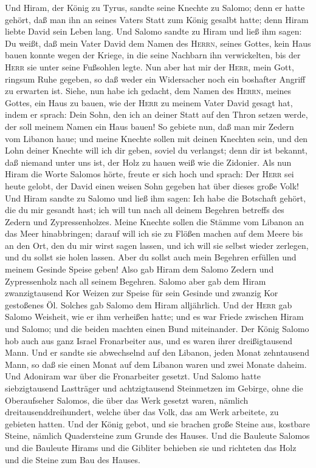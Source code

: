  Und Hiram, der König zu Tyrus, sandte seine Knechte zu
Salomo; denn er hatte gehört, daß man ihn an seines Vaters Statt zum
König gesalbt hatte; denn Hiram liebte David sein Leben lang.
 Und Salomo sandte zu Hiram und ließ ihm sagen:
 Du weißt, daß mein Vater David dem Namen des
\textsc{Herrn}, seines Gottes, kein Haus bauen konnte wegen der Kriege,
in die seine Nachbarn ihn verwickelten, bis der \textsc{Herr} sie unter
seine Fußsohlen legte.  Nun aber hat mir der
\textsc{Herr}, mein Gott, ringsum Ruhe gegeben, so daß weder ein
Widersacher noch ein boshafter Angriff zu erwarten ist. 
Siehe, nun habe ich gedacht, dem Namen des \textsc{Herrn}, meines
Gottes, ein Haus zu bauen, wie der \textsc{Herr} zu meinem Vater David
gesagt hat, indem er sprach: Dein Sohn, den ich an deiner Statt auf den
Thron setzen werde, der soll meinem Namen ein Haus bauen! 
So gebiete nun, daß man mir Zedern vom Libanon haue; und meine Knechte
sollen mit deinen Knechten sein, und den Lohn deiner Knechte will ich
dir geben, soviel du verlangst; denn dir ist bekannt, daß niemand unter
uns ist, der Holz zu hauen weiß wie die Zidonier.  Als nun
Hiram die Worte Salomos hörte, freute er sich hoch und sprach: Der
\textsc{Herr} sei heute gelobt, der David einen weisen Sohn gegeben hat
über dieses große Volk!  Und Hiram sandte zu Salomo und
ließ ihm sagen: Ich habe die Botschaft gehört, die du mir gesandt hast;
ich will tun nach all deinem Begehren betreffs des Zedern und
Zypressenholzes.  Meine Knechte sollen die Stämme vom
Libanon an das Meer hinabbringen; darauf will ich sie zu Flößen machen
auf dem Meere bis an den Ort, den du mir wirst sagen lassen, und ich
will sie selbst wieder zerlegen, und du sollst sie holen lassen. Aber du
sollst auch mein Begehren erfüllen und meinem Gesinde Speise geben!
 Also gab Hiram dem Salomo Zedern und Zypressenholz nach
all seinem Begehren.  Salomo aber gab dem Hiram
zwanzigtausend Kor Weizen zur Speise für sein Gesinde und zwanzig Kor
gestoßenes Öl. Solches gab Salomo dem Hiram alljährlich. 
Und der \textsc{Herr} gab Salomo Weisheit, wie er ihm verheißen hatte;
und es war Friede zwischen Hiram und Salomo; und die beiden machten
einen Bund miteinander.  Der König Salomo hob auch aus
ganz Israel Fronarbeiter aus, und es waren ihrer dreißigtausend Mann.
 Und er sandte sie abwechselnd auf den Libanon, jeden
Monat zehntausend Mann, so daß sie einen Monat auf dem Libanon waren und
zwei Monate daheim. Und Adoniram war über die Fronarbeiter gesetzt.
 Und Salomo hatte siebzigtausend Lastträger und
achtzigtausend Steinmetzen im Gebirge,  ohne die
Oberaufseher Salomos, die über das Werk gesetzt waren, nämlich
dreitausenddreihundert, welche über das Volk, das am Werk arbeitete, zu
gebieten hatten.  Und der König gebot, und sie brachen
große Steine aus, kostbare Steine, nämlich Quadersteine zum Grunde des
Hauses.  Und die Bauleute Salomos und die Bauleute Hirams
und die Gibliter behieben sie und richteten das Holz und die Steine zum
Bau des Hauses.

